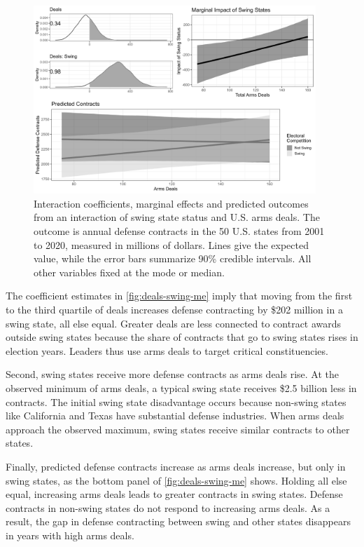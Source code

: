 \documentclass[12pt]{article}
\begin{document}
\begin{figure}[htpb]
	\centering
		\includegraphics[width=0.95\textwidth]{../figures/deals-swing-me.png}
	\caption{Interaction coefficients, marginal effects and predicted outcomes from an interaction of swing state status and U.S. arms deals. The outcome is annual defense contracts in the 50 U.S. states from 2001 to 2020, measured in millions of dollars. Lines give the expected value, while the error bars summarize 90\% credible intervals. All other variables fixed at the mode or median.}
	\label{fig:deals-swing-me}
\end{figure}


The coefficient estimates in \autoref{fig:deals-swing-me} imply that moving from the first to the third quartile of deals increases defense contracting by \$202 million in a swing state, all else equal. 
Greater deals are less connected to contract awards outside swing states because the share of contracts that go to swing states rises in election years. 
Leaders thus use arms deals to target critical constituencies.


Second, swing states receive more defense contracts as arms deals rise. 
At the observed minimum of arms deals, a typical swing state receives \$2.5 billion less in contracts.
The initial swing state disadvantage occurs because non-swing states like California and Texas have substantial defense industries.
When arms deals approach the observed maximum, swing states receive similar contracts to other states. 


Finally, predicted defense contracts increase as arms deals increase, but only in swing states, as the bottom panel of \autoref{fig:deals-swing-me} shows. 
Holding all else equal, increasing arms deals leads to greater contracts in swing states. 
Defense contracts in non-swing states do not respond to increasing arms deals.
As a result, the gap in defense contracting between swing and other states disappears in years with high arms deals. 
\end{document}

